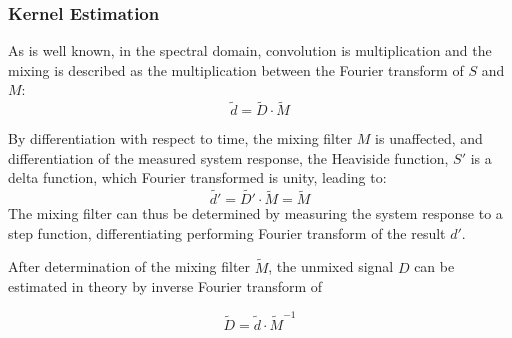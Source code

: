 \documentclass[../../CompleteThesis/Complete_1stDraft]{subfiles}
\begin{document}
\subsubsection{Kernel Estimation}
\label{Subsubsec:SignalAnalysis_BackDiffusion_SignalRestoration_KernelEstimation}
As is well known, in the spectral domain, convolution is multiplication and the mixing is described as the multiplication between the Fourier transform of $S$ and $M$:
\begin{equation}
	\tilde{d} = \tilde{D} \cdot \tilde{M}
\end{equation}


By differentiation with respect to time, the mixing filter $M$ is unaffected, and differentiation of the measured system response, the Heaviside function, $S'$ is a delta function, which Fourier transformed is unity, leading to:
\begin{equation}
	\tilde{d'} = \tilde{D'} \cdot \tilde{M} = \tilde{M}
\end{equation}
The mixing filter can thus be determined by measuring the system response to a step function, differentiating performing Fourier transform of the result $d'$.

After determination of the mixing filter $\tilde{M}$, the unmixed signal $D$ can be estimated in theory by inverse Fourier transform of


\begin{equation}
	\tilde{D} = \tilde{d}\cdot\tilde{M}^{-1}
	\label{eq:Restoration}
\end{equation}
\end{document}
